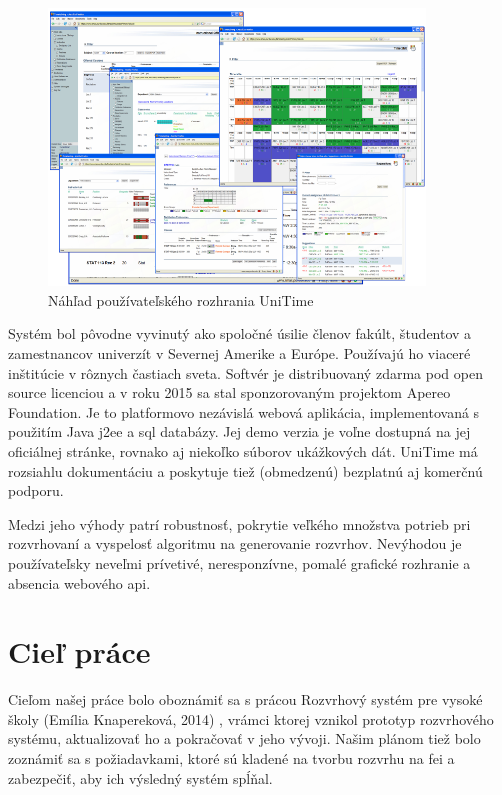 \begin{figure}
  \centering
  \includegraphics[width=10cm]{figures/unitime.png}
  \caption{\label{fig:unitime} Náhľad používateľského rozhrania
    UniTime \cite{unitime}}
\end{figure}

Systém bol pôvodne vyvinutý ako spoločné úsilie členov fakúlt, študentov a
zamestnancov univerzít v Severnej Amerike a Európe. Používajú ho viaceré
inštitúcie v rôznych častiach sveta. Softvér je distribuovaný zdarma pod open
source licenciou a v roku 2015 sa stal sponzorovaným projektom Apereo
Foundation. Je to platformovo nezávislá webová aplikácia, implementovaná s
použitím Java \acrshort{j2ee} a \acrshort{sql} databázy. Jej demo verzia je
voľne dostupná na jej oficiálnej stránke, rovnako aj niekoľko súborov ukážkových
dát. UniTime má rozsiahlu dokumentáciu a poskytuje tiež (obmedzenú) bezplatnú aj
komerčnú podporu.

Medzi jeho výhody patrí robustnosť, pokrytie veľkého množstva potrieb pri
rozvrhovaní a vyspelosť algoritmu na generovanie rozvrhov. Nevýhodou je
používateľsky neveľmi prívetivé, neresponzívne, pomalé grafické rozhranie a
absencia webového \acrshort{api}.

\section{Cieľ práce}
\label{sec:goal}

Cieľom našej práce bolo oboznámiť sa s prácou Rozvrhový systém pre vysoké školy
(Emília Knapereková, 2014) \cite{knap}, vrámci ktorej vznikol prototyp
rozvrhového systému, aktualizovať ho a pokračovať v jeho vývoji. Našim plánom
tiež bolo zoznámiť sa s požiadavkami, ktoré sú kladené na tvorbu rozvrhu na
\acrshort{fei} a zabezpečiť, aby ich výsledný systém spĺňal.

